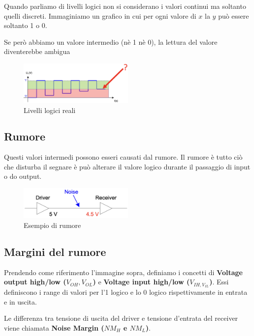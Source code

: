 \documentclass[../main.tex]{subfiles}
\begin{document}
Quando parliamo di livelli logici non si considerano i valori continui ma soltanto quelli discreti.
Immaginiamo un grafico in cui per ogni valore di $x$ la $y$ può essere soltanto 1 o 0.

Se però abbiamo un valore intermedio (nè 1 nè 0), la lettura del valore diventerebbe ambigua
\begin{figure}[h]
    \centering
    \includegraphics[width=0.5\textwidth]{images/logicLevels.png}
    \caption{Livelli logici reali}
\end{figure}

\subsection{Rumore}
Questi valori intermedi possono esseri causati dal rumore. Il rumore è tutto ciò che disturba il segnare
è può alterare il valore logico durante il passaggio di input o do output.
\begin{figure}[h]
    \centering
    \includegraphics[width=0.5\textwidth]{images/rumore.png}
    \caption{Esempio di rumore}
\end{figure}

\subsection{Margini del rumore}
Prendendo come riferimento l'immagine sopra, definiamo i concetti di \textbf{Voltage output high/low ($V_{OH}, V_{OL}$)} e \textbf{Voltage input high/low ($V_{IH, V_{IL}}$)}.
Essi definiscono i range di valori per l'1 logico e lo 0 logico rispettivamente in entrata e in uscita.

Le differenza tra tensione di uscita del driver e tensione d'entrata del receiver viene chiamata \textbf{Noise Margin ($NM_H$ e $NM_L$)}.
\end{document}
